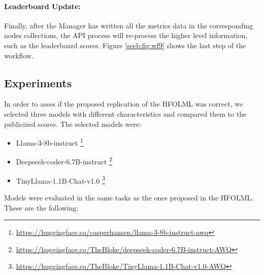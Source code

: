 \paragraph{Leaderboard Update:}

Finally, after the Manager has written all the metrics data in the corresponding nodes collections, the API process will re-process the higher level information, such as the leaderboard scores. 
Figure \ref{secb:fig:wf9} shows the last step of the workflow.





\subsection{Experiments}

In order to asses if the proposed replication of the \gls{HFOLML} was correct, we selected three models with different characteristics and compared them to the publicized scores. The selected models were:

\begin{itemize}[noitemsep]
    \item Llama-3-8b-instruct \footnote{\url{https://huggingface.co/casperhansen/llama-3-8b-instruct-awq}}
    \item Deepseek-coder-6.7B-instruct \footnote{\url{https://huggingface.co/TheBloke/deepseek-coder-6.7B-instruct-AWQ}}
    \item TinyLlama-1.1B-Chat-v1.0 \footnote{\url{https://huggingface.co/TheBloke/TinyLlama-1.1B-Chat-v1.0-AWQ}}
\end{itemize}

Models were evaluated in the same tasks as the ones proposed in the \gls{HFOLML}. These are the following:

